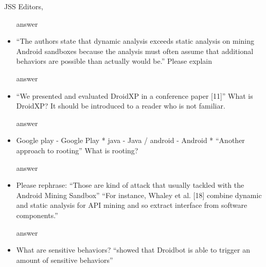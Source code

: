 \documentclass{letter}
\begin{document}
\begin{letter}{JSS Editors,}
\begin{itemize}
\vspace{0.2cm}

{\color{blue}{\bf Answer:} answer}

\vspace{0.2cm}

\item ``The authors state that dynamic analysis exceeds static analysis on mining Android sandboxes because the
analysis must often assume that additional behaviors are possible than actually would be.''
Please explain


\vspace{0.2cm}

{\color{blue}{\bf Answer:} answer}

\vspace{0.2cm}

\item ``We presented and evaluated DroidXP in a conference paper [11]''
What is DroidXP? It should be introduced to a reader who is not familiar.


\vspace{0.2cm}

{\color{blue}{\bf Answer:} answer}

\vspace{0.2cm}

\item Google play - Google Play
* java - Java / android - Android
* ``Another approach to rooting''
What is rooting?


\vspace{0.2cm}

{\color{blue}{\bf Answer:} answer}

\vspace{0.2cm}

\item Please rephrase:
``Those are kind of attack that usually tackled with the Android Mining Sandbox''
``For instance, Whaley et al. [18] combine dynamic and static analysis for API mining and so extract interface from software components.''


\vspace{0.2cm}

{\color{blue}{\bf Answer:} answer}

\vspace{0.2cm}

\item What are sensitive behaviors? ``showed that Droidbot is able to trigger an amount of sensitive behaviors''


\vspace{0.2cm}


\end{itemize}
\end{letter}
\end{document}
